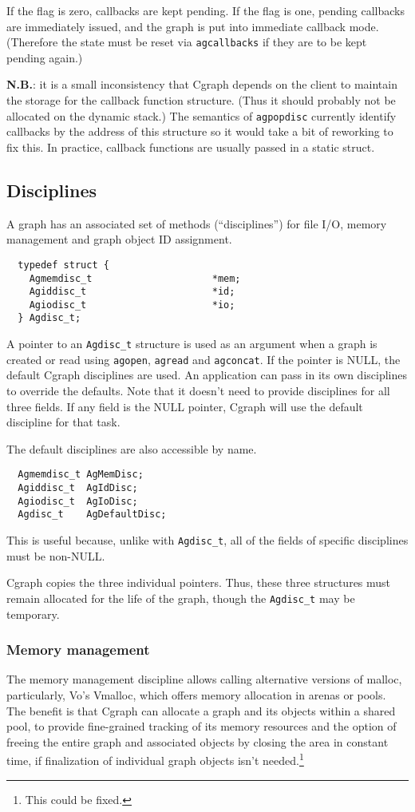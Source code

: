 \documentclass[11pt,letterpaper]{article}
\begin{document}
If the flag is zero, callbacks are kept pending. 
If the flag is one, pending callbacks are immediately issued,
and the graph is put into immediate callback mode.
(Therefore the state must be reset via \verb"agcallbacks"
if they are to be kept pending again.)

{\bf N.B.}: it is a small inconsistency that Cgraph depends on the client
to maintain the storage for the callback function structure.
(Thus it should probably not be allocated on the dynamic stack.)
The semantics of \verb"agpopdisc" currently identify callbacks by
the address of this structure so it would take a bit of reworking
to fix this.  In practice, callback functions are usually passed
in a static struct.

\subsection{Disciplines}
\label{subsec:disciplines}
A graph has an associated set of methods (``disciplines'')
for file I/O, memory management and graph object ID assignment.
\begin{verbatim}
  typedef struct {   
    Agmemdisc_t                     *mem;
    Agiddisc_t                      *id;
    Agiodisc_t                      *io;
  } Agdisc_t;
\end{verbatim}
A pointer to an \verb"Agdisc_t" structure is used as an argument when
a graph is created or read using \verb"agopen",
\verb"agread" and \verb"agconcat". If the pointer is NULL, the default
Cgraph disciplines are used. An application can pass in its own disciplines
to override the defaults. Note that it doesn't need to provide disciplines for
all three fields. If any field is the NULL pointer, Cgraph will use the default
discipline for that task.

The default disciplines are also accessible by name.
\begin{verbatim}
  Agmemdisc_t AgMemDisc;
  Agiddisc_t  AgIdDisc;
  Agiodisc_t  AgIoDisc;
  Agdisc_t    AgDefaultDisc;
\end{verbatim}
This is useful because, unlike with \verb"Agdisc_t", all of the fields of
specific disciplines must be non-NULL.

Cgraph copies the three individual pointers. Thus, these three structures must remain
allocated for the life of the graph, though the \verb"Agdisc_t" may be temporary.

\subsubsection{Memory management}
The memory management discipline allows calling alternative versions
of malloc, particularly, Vo's Vmalloc, which offers memory allocation
in arenas or pools.  The benefit is that Cgraph can allocate a graph
and its objects within a shared pool,
to provide fine-grained tracking of its memory resources
and the option of freeing the entire graph and associated objects
by closing the area in constant time, if finalization of individual
graph objects isn't needed.\footnote{This could be fixed.}
\end{document}
